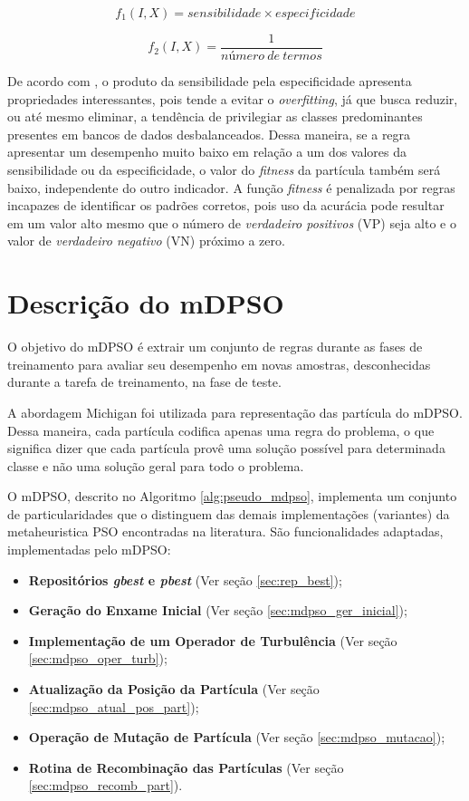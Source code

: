 \documentclass[
	12pt,				%
	openany,			%
	oneside,	
	a4paper,			%
	brazil,				%
	]{unimontes-ppgmsc-abntex2}
\begin{document}
\begin{equation}
\label{eq:fitness1}
f_1(I,X) = sensibilidade \times especificidade
\end{equation}

\begin{equation}
\label{eq:fitness2}
f_2(I,X) = \frac{1}{número\ de\ termos}
\end{equation}

De acordo com , o produto da sensibilidade pela especificidade apresenta propriedades interessantes, pois tende a evitar o {\em overfitting}, já que busca reduzir, ou até mesmo eliminar, a tendência de privilegiar as classes predominantes presentes em bancos de dados desbalanceados. Dessa maneira, se a regra apresentar um desempenho muito baixo em relação a um dos valores da sensibilidade ou da especificidade, o valor do {\em fitness} da partícula também será baixo, independente do outro indicador. A função {\em fitness} é penalizada por regras incapazes de identificar os padrões corretos, pois uso da acurácia pode resultar em um valor alto mesmo que o número de {\em verdadeiro positivos} (VP) seja alto e o valor de {\em verdadeiro negativo} (VN) próximo a zero. 

\section{Descrição do mDPSO}
\label{sec:desc_mdpso}

O objetivo do mDPSO é extrair um conjunto de regras durante as fases de treinamento para avaliar seu desempenho em novas amostras, desconhecidas durante a tarefa de treinamento, na fase de teste.

A abordagem Michigan foi utilizada para representação das partícula do mDPSO. Dessa maneira, cada partícula codifica apenas uma regra do problema, o que significa dizer que cada partícula provê uma solução possível para determinada classe e não uma solução geral para todo o problema. 

O mDPSO, descrito no Algoritmo \ref{alg:pseudo_mdpso}, implementa um conjunto de particularidades que o distinguem das demais implementações (variantes) da metaheuristica PSO encontradas na literatura. São funcionalidades adaptadas, implementadas pelo mDPSO:

\begin{itemize}
\item \textbf{Repositórios {\em gbest} e {\em pbest}} (Ver seção \ref{sec:rep_best});
\item \textbf{Geração do Enxame Inicial} (Ver seção \ref{sec:mdpso_ger_inicial});
\item \textbf{Implementação de um Operador de Turbulência} (Ver seção \ref{sec:mdpso_oper_turb});
\item \textbf{Atualização da Posição da Partícula} (Ver seção \ref{sec:mdpso_atual_pos_part});
\item \textbf{Operação de Mutação de Partícula} (Ver seção \ref{sec:mdpso_mutacao});
\item \textbf{Rotina de Recombinação das Partículas} (Ver seção \ref{sec:mdpso_recomb_part}).
\end{itemize}
\end{document}
